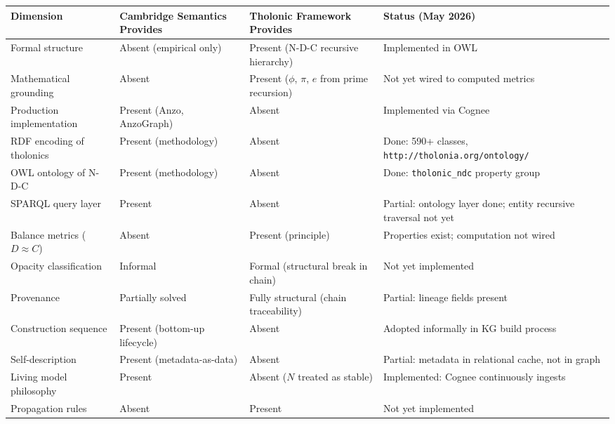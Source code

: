 \documentclass[12pt]{article}
\begin{document}
\begin{longtable}[]{@{}
  >{\raggedright\arraybackslash}p{}
  >{\raggedright\arraybackslash}p{}
  >{\raggedright\arraybackslash}p{}
  >{\raggedright\arraybackslash}p{}@{}}
\toprule\noalign{}
\begin{minipage}[b]{\linewidth}\raggedright
Dimension
\end{minipage} & \begin{minipage}[b]{\linewidth}\raggedright
Cambridge Semantics Provides
\end{minipage} & \begin{minipage}[b]{\linewidth}\raggedright
Tholonic Framework Provides
\end{minipage} & \begin{minipage}[b]{\linewidth}\raggedright
Status (May 2026)
\end{minipage} \\
\midrule\noalign{}
\endhead
\bottomrule\noalign{}
\endlastfoot
Formal structure & Absent (empirical only) & Present (N-D-C recursive
hierarchy) & Implemented in OWL \\
Mathematical grounding & Absent & Present (\(\phi\), \(\pi\), \(e\) from
prime recursion) & Not yet wired to computed metrics \\
Production implementation & Present (Anzo, AnzoGraph) & Absent &
Implemented via Cognee \\
RDF encoding of tholonics & Present (methodology) & Absent & Done: 590+
classes, \texttt{http://tholonia.org/ontology/} \\
OWL ontology of N-D-C & Present (methodology) & Absent & Done:
\texttt{tholonic\_ndc} property group \\
SPARQL query layer & Present & Absent & Partial: ontology layer done;
entity recursive traversal not yet \\
Balance metrics (\(D \approx C\)) & Absent & Present (principle) &
Properties exist; computation not wired \\
Opacity classification & Informal & Formal (structural break in chain) &
Not yet implemented \\
Provenance & Partially solved & Fully structural (chain traceability) &
Partial: lineage fields present \\
Construction sequence & Present (bottom-up lifecycle) & Absent & Adopted
informally in KG build process \\
Self-description & Present (metadata-as-data) & Absent & Partial:
metadata in relational cache, not in graph \\
Living model philosophy & Present & Absent (\(N\) treated as stable) &
Implemented: Cognee continuously ingests \\
Propagation rules & Absent & Present & Not yet implemented \\
\end{longtable}
\end{document}

